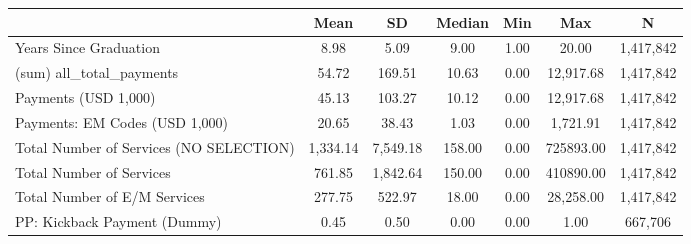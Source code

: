 {
\def\sym#1{\ifmmode^{#1}\else\(^{#1}\)\fi}
\begin{tabular}{l*{1}{cccccc}}
\hline\hline
                    &        Mean&          SD&      Median&         Min&         Max&           N\\
\hline
Years Since Graduation&        8.98&        5.09&        9.00&        1.00&       20.00&   1,417,842\\
(sum) all\_total\_payments&       54.72&      169.51&       10.63&        0.00&   12,917.68&   1,417,842\\
Payments (USD 1,000)&       45.13&      103.27&       10.12&        0.00&   12,917.68&   1,417,842\\
Payments: EM Codes (USD 1,000)&       20.65&       38.43&        1.03&        0.00&    1,721.91&   1,417,842\\
Total Number of Services (NO SELECTION)&    1,334.14&    7,549.18&      158.00&        0.00&   725893.00&   1,417,842\\
Total Number of Services&      761.85&    1,842.64&      150.00&        0.00&   410890.00&   1,417,842\\
Total Number of E/M Services&      277.75&      522.97&       18.00&        0.00&   28,258.00&   1,417,842\\
PP: Kickback Payment (Dummy)&        0.45&        0.50&        0.00&        0.00&        1.00&     667,706\\
\hline\hline
\end{tabular}
}
